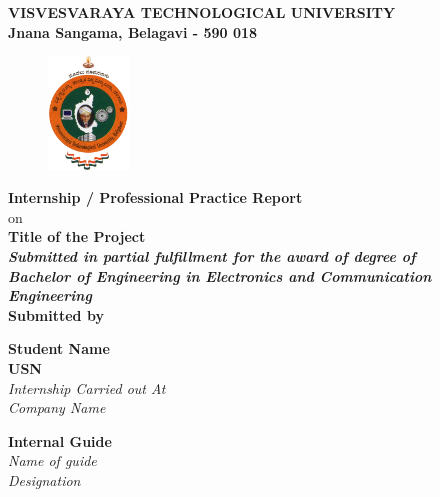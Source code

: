 
\begin{titlingpage}
\thispagestyle{empty}\centering

\setlength{\toptafiddle}{1in}
\setlength{\bottafiddle}{1in}
\vspace*{-1.25in}
\enlargethispage{\toptafiddle}
\large 
\textbf{VISVESVARAYA TECHNOLOGICAL UNIVERSITY\\
	Jnana Sangama, Belagavi - 590 018}\\
\vspace{0.2cm}
\begin{figure}[h]
\centering
\includegraphics[height=3cm]{images/vtu.png}
\end{figure}
\textbf{\color{red}Internship / Professional Practice Report}\\
{\color{red}on}\\

\Large{\textbf{\color{blue}Title of the Project}}\\
\small{\textit{\textbf{\color{red}Submitted in partial fulfillment for the award of degree of}}}\\

\vspace{0.2cm}
\textit{\textbf{\color{blue}Bachelor of Engineering in Electronics and Communication Engineering}}
\vspace{0.5cm}\\
\textbf{Submitted by}


\begin{center}
	\Large\textbf{\color{blue}Student Name}\\
	\Large\textbf{\color{blue}USN}\\
		
	\textit{\color{red}Internship Carried out At}\\
	
	\textit{\color{blue}Company Name}\\
\end{center}
\vspace{0.3cm}

\begin{minipage}[t]{0.6\textwidth}%
	\Large\textbf{Internal Guide}\\
	\large\textit{\color{blue}Name of guide}\\
	\large\textit{\color{blue}Designation}\\
	

\end{minipage}
\end{titlingpage}
